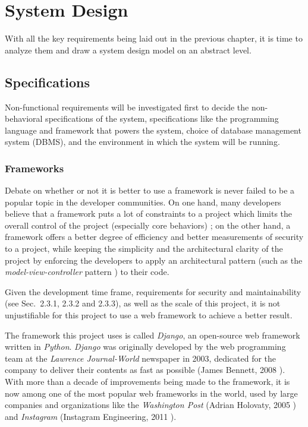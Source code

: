 

\chapter{System Design}
\label{chap:SYSDES}

With all the key requirements being laid out in the previous chapter, it is
time to analyze them and draw a system design model on an abstract
level. 

\section{Specifications}
Non-functional requirements will be investigated first to decide the
non-behavioral specifications of the system, specifications like the
programming language and framework that powers the system, choice of database
management system (DBMS),
and the environment in which the system will be running.

\subsection{Frameworks}
Debate on whether or not it is better to use a framework is never failed to be
a popular topic in the developer communities. On one hand, many developers
believe that a framework puts a lot of constraints to a project which limits the
overall control of the project (especially core behaviors) \cite{frameworks};
on the other hand, a framework offers a better degree of efficiency and better
measurements of security to a project, while keeping the simplicity and
the architectural clarity of the project by enforcing the developers to apply
an architectural pattern (such as the \emph{model-view-controller} pattern
\cite{mvc}) to their code.

\medskip

Given the development time frame, requirements for
security and maintainability (see Sec.~2.3.1, 2.3.2 and 2.3.3),
as well as the scale of this project,
it is not unjustifiable for this project to use a web framework to achieve a
better result.

\medskip

The framework this project uses is called \emph{Django}, an open-source web
framework written in \emph{Python}. \emph{Django} was originally developed by
the web programming team at the \emph{Lawrence Journal-World} newspaper in 2003,
dedicated for the company to deliver their contents as fast as possible
(James Bennett, 2008 \cite{django}). With more than a decade of improvements
being made to the framework, it is now among one of the most popular web
frameworks in the world, used by large companies and organizations like the
\emph{Washington Post} (Adrian Holovaty, 2005 \cite{djangoWashingtonPost})
and \emph{Instagram} (Instagram Engineering, 2011 \cite{djangoInstagram}).
\medskip

